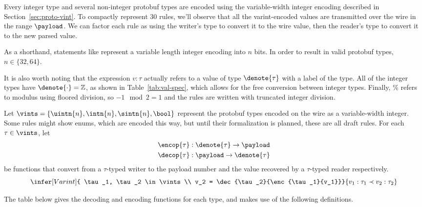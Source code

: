 Every integer type and several non-integer protobuf types are encoded using the
variable-width integer encoding described in Section~\ref{sec:proto-vint}. To
compactly represent 30 rules, we'll observe that all the varint-encoded values
are transmitted over the wire in the range $\payload$. We can factor each
rule as using the writer's type to convert it to the wire value, then the
reader's type to convert it to the new parsed value.

As a shorthand, statements like  represent a variable length integer
encoding into $n$ bits. In order to result in valid protobuf types,
$n \in \{32, 64\}$. 

It is also worth noting that the expression $v : \tau$ actually refers to a value
of type $\denote{\tau}$ with a label of the type. All of the integer
types have $\denote{\cdot} = \mathbb{Z}$, as shown in Table~\ref{tab:val-spec},
which allows for the free conversion between integer types. Finally, $\%$ refers
to modulus using floored division, so $-1 \mod 2 = 1$ and the rules are
written with truncated integer division.

Let $\vints = \left\{ \uintn{n}, \intn{n}, \sintn{n}, \bool \right\}$ represent
the protobuf types encoded on the wire as a variable-width integer. Some rules
might show enums, which are encoded this way, but until their formalization is
planned, these are all draft rules. For each $\tau \in \vints$, let
\begin{align*}
  \encop{\tau} &: \denote{\tau} \rightarrow \payload \\
  \decop{\tau} &: \payload \rightarrow \denote{\tau}
\end{align*}
be functions that convert from a $\tau$-typed writer to the payload number and
the value recovered by a $\tau$-typed reader respectively.
\[
  \infer[Varint]{ \tau_1, \tau_2 \in \vints \\ v_2 =
    \dec{\tau_2}{\enc{\tau_1}{v_1}}}{v_1 : \tau_1 \prec v_2 : \tau_2}
\]

The table below gives the decoding and encoding functions for each type, and
makes use of the following definitions.

